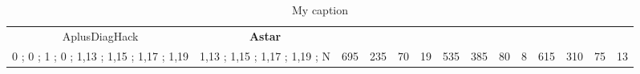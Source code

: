 \begin{table}[]
{\begin{tabular}{|c|c|c|c|c|c|c|c|c|c|c|c|c|c|}
AplusDiagHack & \cellcolor{blue!15}\textbf{Astar}& {\color[HTML]{00009B} } & {\color[HTML]{9A0000} } & {\color[HTML]{009901} } &  & {\color[HTML]{00009B} } & {\color[HTML]{9A0000} } & {\color[HTML]{009901} } &  & {\color[HTML]{00009B} } & {\color[HTML]{9A0000} } & {\color[HTML]{009901} } &  \\ 
0 ; 0 ; 1 ; 0 ; 1,13 ; 1,15 ; 1,17 ; 1,19 & \cellcolor{ blue!15}1,13 ; 1,15 ; 1,17 ; 1,19 ; N & \multirow{-2}{*}{{\color[HTML]{00009B} 695}} & \multirow{-2}{*}{{\color[HTML]{9A0000} 235}} & \multirow{-2}{*}{{\color[HTML]{009901} 70}} & \multirow{-2}{*}{19} & \multirow{-2}{*}{{\color[HTML]{00009B} 535}} & \multirow{-2}{*}{{\color[HTML]{9A0000} 385}} & \multirow{-2}{*}{{\color[HTML]{009901} 80}} & \multirow{-2}{*}{8} & \multirow{-2}{*}{{\color[HTML]{00009B} 615}} & \multirow{-2}{*}{{\color[HTML]{9A0000} 310}} & \multirow{-2}{*}{{\color[HTML]{009901} 75}} & \multirow{-2}{*}{13} \\ \hline
\end{tabular}} \caption{ My caption} \label{ my - label} \end{table}
